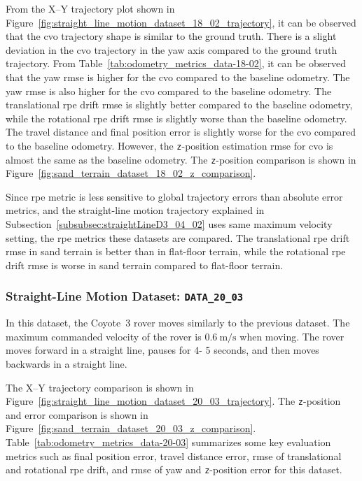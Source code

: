 \documentclass[report.tex]{subfiles}
\begin{document}
        
    From the X--Y trajectory plot shown in Figure~\ref{fig:straight_line_motion_dataset_18_02_trajectory}, it can be observed that the \gls{cvo} trajectory shape is similar to the ground truth. There is a slight deviation in the \gls{cvo} trajectory in the yaw axis compared to the ground truth trajectory. From Table~\ref{tab:odometry_metrics_data-18-02}, it can be observed that the yaw \gls{rmse} is higher for the \gls{cvo} compared to the baseline odometry. The yaw \gls{rmse} is also higher for the \gls{cvo} compared to the baseline odometry. The translational \gls{rpe} drift \gls{rmse} is slightly better compared to the baseline odometry, while the rotational \gls{rpe} drift \gls{rmse} is slightly worse than the baseline odometry. The travel distance and final position error is slightly worse for the \gls{cvo} compared to the baseline odometry. However, the \texttt{z}-position estimation \gls{rmse} for \gls{cvo} is almost the same as the baseline odometry. The \texttt{z}-position comparison is shown in Figure~\ref{fig:sand_terrain_dataset_18_02_z_comparison}. 
    
    Since \gls{rpe} metric is less sensitive to global trajectory errors than absolute error metrics, and the straight-line motion trajectory explained in Subsection~\ref{subsubsec:straightLineD3_04_02} uses same maximum velocity setting, the \gls{rpe} metrics these datasets are compared. The translational \gls{rpe} drift \gls{rmse} in sand terrain is better than in flat-floor terrain, while the rotational \gls{rpe} drift \gls{rmse} is worse in sand terrain compared to flat-floor terrain. 
    \FloatBarrier

    \subsubsection{Straight-Line Motion Dataset: \texttt{DATA\_20\_03}} \label{subsubsec:straightLineMotionD3_20_03}
    
    In this dataset, the Coyote~3 rover moves similarly to the previous dataset. The maximum commanded velocity of the rover is $0.6~\mathrm{m/s}$ when moving. The rover moves forward in a straight line, pauses for 4- 5 seconds, and then moves backwards in a straight line. 
    
    The X--Y trajectory comparison is shown in Figure~\ref{fig:straight_line_motion_dataset_20_03_trajectory}. The \texttt{z}-position and error comparison is shown in Figure~\ref{fig:sand_terrain_dataset_20_03_z_comparison}. Table~\ref{tab:odometry_metrics_data-20-03} summarizes some key evaluation metrics such as final position error, travel distance error, \gls{rmse} of translational and rotational \gls{rpe} drift, and \gls{rmse} of yaw and \texttt{z}-position error for this dataset.
    
\end{document}
